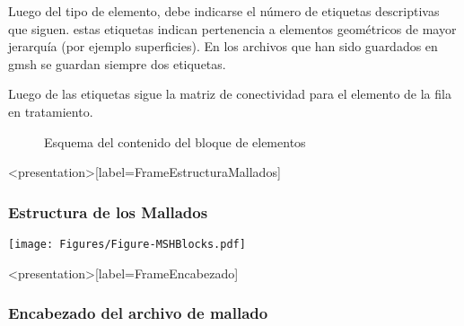 Luego del tipo de elemento, debe indicarse el número de 
etiquetas descriptivas que siguen. estas etiquetas indican
pertenencia  a elementos geométricos de mayor jerarquía 
(por ejemplo superficies). En los archivos
que han sido guardados en gmsh se guardan siempre dos 
etiquetas. 

Luego de las etiquetas sigue la matriz de conectividad para 
el elemento de la fila en tratamiento.

\begin{figure}
  \caption{Esquema del contenido del bloque de elementos
  \label{FiguraDefinicionElementos} }
  
\end{figure}

\mode*
\begin{frame}<presentation>[label=FrameEstructuraMallados]
  \frametitle{Estructura de los Mallados}
  \hfill
  \texttt{[image: Figures/Figure-MSHBlocks.pdf]}
\end{frame}

\begin{frame}<presentation>[label=FrameEncabezado]
  \frametitle{Encabezado del archivo de mallado}


      
% 	   
% 
% 
% 
% 
% 
% 
\end{frame}

